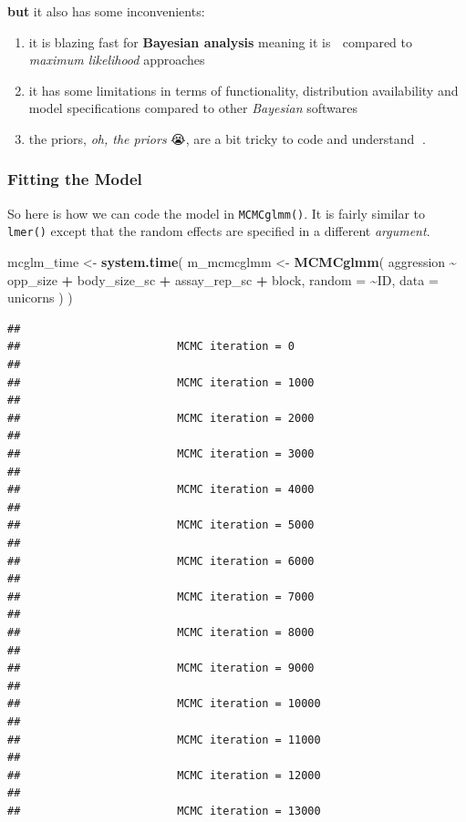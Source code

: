 \documentclass[
  12pt,
]{book}
\newenvironment{Shaded}{\begin{snugshade}}{\end{snugshade}}
\newcommand{\DataTypeTok}[1]{\textcolor[rgb]{0.13,0.29,0.53}{#1}}
\newcommand{\KeywordTok}[1]{\textcolor[rgb]{0.13,0.29,0.53}{\textbf{#1}}}
\newcommand{\NormalTok}[1]{#1}
\newcommand{\OperatorTok}[1]{\textcolor[rgb]{0.81,0.36,0.00}{\textbf{#1}}}
\newcommand{\StringTok}[1]{\textcolor[rgb]{0.31,0.60,0.02}{#1}}
\providecommand{\tightlist}{%
  \setlength{\itemsep}{0pt}\setlength{\parskip}{0pt}}
\begin{document}
\textbf{but} it also has some inconvenients:

\begin{enumerate}
\def\labelenumi{\arabic{enumi}.}
\tightlist
\item
  it is blazing fast for \textbf{Bayesian analysis} meaning it is 🐌 compared to \emph{maximum likelihood} approaches
\item
  it has some limitations in terms of functionality, distribution availability and model specifications compared to other \emph{Bayesian} softwares
\item
  the priors, \emph{oh, the priors} 😭, are a bit tricky to code and understand 🤯.
\end{enumerate}

\hypertarget{fitting-the-model}{%
\subsubsection{Fitting the Model}\label{fitting-the-model}}

So here is how we can code the model in \texttt{MCMCglmm()}. It is fairly similar to \texttt{lmer()} except that the random effects are specified in a different \emph{argument}.

\begin{Shaded}
\begin{Highlighting}[]
\NormalTok{mcglm\_time \textless{}{-}}\StringTok{ }\KeywordTok{system.time}\NormalTok{(}
\NormalTok{  m\_mcmcglmm \textless{}{-}}\StringTok{ }\KeywordTok{MCMCglmm}\NormalTok{(}
\NormalTok{    aggression }\OperatorTok{\textasciitilde{}}\StringTok{ }\NormalTok{opp\_size }\OperatorTok{+}\StringTok{ }\NormalTok{body\_size\_sc }\OperatorTok{+}\StringTok{ }\NormalTok{assay\_rep\_sc }\OperatorTok{+}\StringTok{ }\NormalTok{block,}
    \DataTypeTok{random =} \OperatorTok{\textasciitilde{}}\NormalTok{ID,}
    \DataTypeTok{data =}\NormalTok{ unicorns}
\NormalTok{  )}
\NormalTok{)}
\end{Highlighting}
\end{Shaded}

\begin{verbatim}
## 
##                        MCMC iteration = 0
## 
##                        MCMC iteration = 1000
## 
##                        MCMC iteration = 2000
## 
##                        MCMC iteration = 3000
## 
##                        MCMC iteration = 4000
## 
##                        MCMC iteration = 5000
## 
##                        MCMC iteration = 6000
## 
##                        MCMC iteration = 7000
## 
##                        MCMC iteration = 8000
## 
##                        MCMC iteration = 9000
## 
##                        MCMC iteration = 10000
## 
##                        MCMC iteration = 11000
## 
##                        MCMC iteration = 12000
## 
##                        MCMC iteration = 13000
\end{verbatim}
\end{document}
